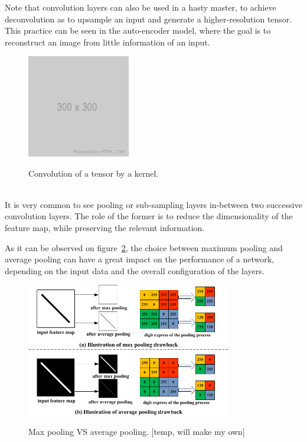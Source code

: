 Note that convolution layers can also be used in a hasty master, to achieve
deconvolution as to upsample an input and generate a higher-resolution tensor.
This practice can be seen in the auto-encoder model, where the goal is to
reconstruct an image from little information of an input.

\begin{figure}[h]
	\center
	\includegraphics[width=0.4\textwidth]{figure/300x300.png}
	\label{fig:convolution}
	\caption{Convolution of a tensor by a kernel.}
\end{figure}


~\\It is very common to see pooling or sub-sampling layers in-between two
successive convolution layers. The role of the former is to reduce the
dimensionality of the feature map, while preserving the relevant information.

As it can be observed on figure~\ref{fig:pooling}, the choice between maximum
pooling and average pooling can have a great impact on the performance of a
network, depending on the input data and the overall configuration of the
layers. 
\newpage

\begin{figure}[h]
	\centering
	\includegraphics[width=0.8\textwidth]{figure/max_vs_avrg_pooling.png}
	\label{fig:pooling}
	\caption{Max pooling VS average pooling. [temp, will make my own]}
\end{figure}

